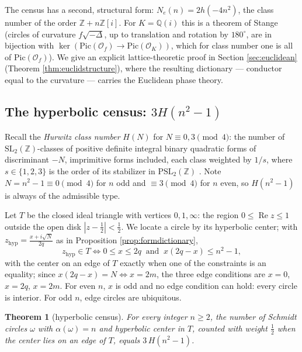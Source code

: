 \documentclass[11pt]{amsart}
\numberwithin{equation}{section}
\theoremstyle{plain}
\newtheorem{theorem}{Theorem}[section]
\theoremstyle{definition}
\theoremstyle{remark}
\newcommand{\Q}{\mathbb{Q}}
\newcommand{\Z}{\mathbb{Z}}
\newcommand{\Zi}{\Z[i]}
\newcommand{\SL}{\mathrm{SL}}
\newcommand{\PSL}{\mathrm{PSL}}
\newcommand{\Pic}{\mathrm{Pic}}
\newcommand{\re}{\operatorname{Re}}
\begin{document}
The census has a second, structural form: $N_e(n) = 2h(-4n^2)$, the
class number of the order $\Z + n\Zi$.  For $K = \Q(i)$ this is a
theorem of Stange \cite{StangeIMRN} (circles of curvature
$f\sqrt{-\Delta}$, up to translation and rotation by $180^\circ$, are in
bijection with $\ker(\Pic(\mathcal{O}_f) \to \Pic(\mathcal{O}_K))$,
which for class number one is all of $\Pic(\mathcal{O}_f)$).  We give an
explicit lattice-theoretic proof in Section \ref{sec:euclidean} (Theorem
\ref{thm:euclidstructure}), where the resulting dictionary --- conductor
equal to the curvature --- carries the Euclidean phase theory.

\subsection{The hyperbolic census: $3H(n^2 - 1)$}\label{subsec:hyp-count}

Recall the \emph{Hurwitz class number} $H(N)$ for $N \equiv 0, 3 \pmod
4$: the number of $\SL_2(\Z)$-classes of positive definite integral
binary quadratic forms of discriminant $-N$, imprimitive forms included,
each class weighted by $1/s$, where $s \in \{1, 2, 3\}$ is the order of
its stabilizer in $\PSL_2(\Z)$ \cite{Cohen1975, Zagier1975}.  Note
$N = n^2 - 1 \equiv 0 \pmod 4$ for $n$ odd and $\equiv 3 \pmod 4$ for
$n$ even, so $H(n^2 - 1)$ is always of the admissible type.

Let $T$ be the closed ideal triangle with vertices $0, 1, \infty$: the
region $0 \le \re z \le 1$ outside the open disk $|z - \tfrac12| <
\tfrac12$.  We locate a circle by its hyperbolic center; with
$z_{\mathrm{hyp}} = \tfrac{x + i\sqrt N}{2q}$ as in Proposition
\ref{prop:formdictionary},
\[
  z_{\mathrm{hyp}} \in T \iff 0 \le x \le 2q \ \text{ and } \
  x(2q - x) \le n^2 - 1,
\]
with the center on an edge of $T$ exactly when one of the constraints is
an equality; since $x(2q - x) = N \iff x = 2m$, the three edge conditions
are $x = 0$, $x = 2q$, $x = 2m$.  For even $n$, $x$ is odd and no edge
condition can hold: every circle is interior.  For odd $n$, edge circles
are ubiquitous.

\begin{theorem}[hyperbolic census]\label{thm:hyperbolic}
For every integer $n \ge 2$, the number of Schmidt circles $\omega$ with
$\alpha(\omega) = n$ and hyperbolic center in $T$, counted with weight
$\tfrac12$ when the center lies on an edge of $T$, equals
$3\,H(n^2 - 1)$.
\end{theorem}
\end{document}
